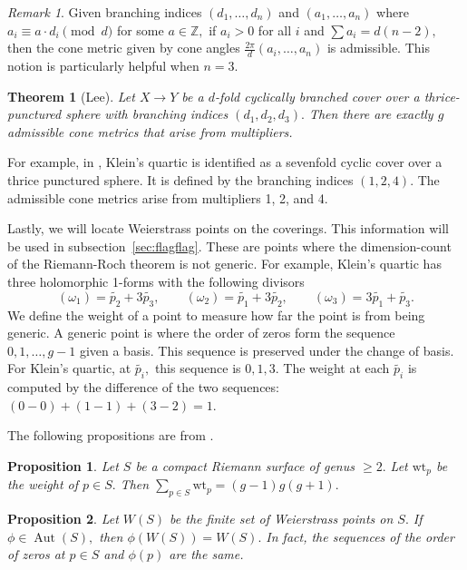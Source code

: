 \documentclass[12pt,reqno]{amsart}
\DeclareMathOperator{\Aut}{Aut}
\newtheorem*{thm*}{Theorem}
\newtheorem*{proposition}{Proposition}
\theoremstyle{definition}
\theoremstyle{remark}
\newtheorem*{remark}{Remark}
\begin{document}
\begin{remark} Given branching indices $(d_1, \ldots , d_n)$ and $(a_1, \ldots , a_n)$ where $a_i \equiv a \cdot d_i \pmod d$ for some $a \in \mathbb{Z},$ if $a_i > 0$ for all $i$ and $\sum a_i = d (n - 2),$ then the cone metric given by cone angles $\frac{2 \pi}{d} (a_i, \ldots , a_n)$ is admissible. This notion is particularly helpful when $n = 3.$\end{remark}

\begin{thm*} [Lee]
Let $X \rightarrow Y$ be a $d$-fold cyclically branched cover over a thrice-punctured sphere with branching indices $(d_1, d_2, d_3).$ Then there are exactly $g$ admissible cone metrics that arise from multipliers. 
\end{thm*}

For example, in \cite{kw}, Klein's quartic is identified as a sevenfold cyclic cover over a thrice punctured sphere. It is defined by the branching indices $(1, 2, 4).$ The admissible cone metrics arise from multipliers 1, 2, and 4. 

Lastly, we will locate Weierstrass points on the coverings. This information will be used in subsection~\ref{sec:flagflag}. These are points where the dimension-count of the Riemann-Roch theorem is not generic. For example, Klein's quartic has three holomorphic 1-forms with the following divisors $$(\omega_1) = \widetilde{p_2} + 3 \widetilde{p_3}, \qquad (\omega_2) = \widetilde{p_1} + 3 \widetilde{p_2}, \qquad (\omega_3) = 3 \widetilde{p_1} + \widetilde{p_3}.$$ We define the weight of a point to measure how far the point is from being generic. A generic point is where the order of zeros form the sequence $0, 1, \ldots , g - 1$ given a basis. This sequence is preserved under the change of basis. For Klein's quartic, at $\widetilde{p_i},$ this sequence is $0, 1, 3.$ The weight at each $\widetilde{p_i}$ is computed by the difference of the two sequences: $(0 - 0) + (1 - 1) + (3 - 2) = 1.$ 

The following propositions are from \cite{fk}. 

\begin{proposition} Let $S$ be a compact Riemann surface of genus $\geq 2.$ Let $\textrm{wt}_p$ be the weight of $p \in S.$ Then $\sum\limits_{p \in S} \textrm{wt}_p = (g - 1) g (g + 1).$
\end{proposition}

\begin{proposition} Let $W(S)$ be the finite set of Weierstrass points on $S.$ If $\phi \in \Aut(S),$ then $\phi (W(S)) = W(S).$ In fact, the sequences of the order of zeros at $p \in S$ and $\phi(p)$ are the same.
\end{proposition}
\end{document}
